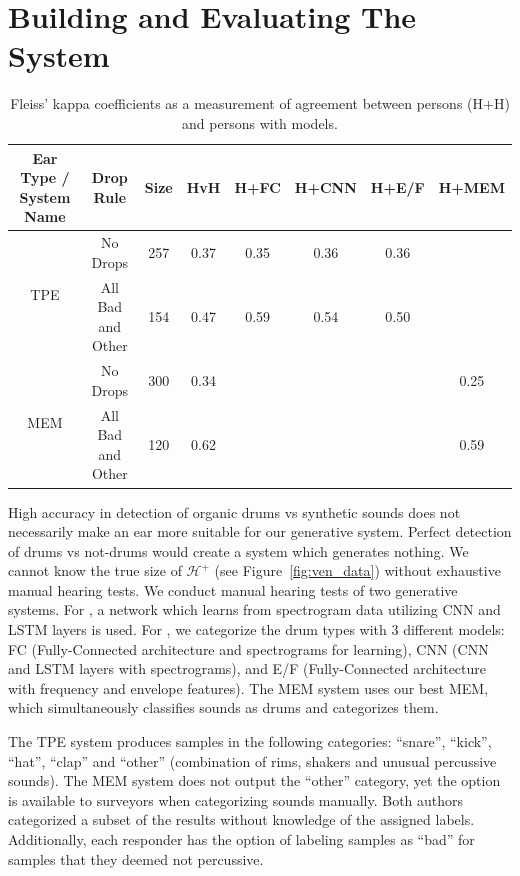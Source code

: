 \documentclass[runningheads,a4paper]{llncs}
\begin{document}
\section{Building and Evaluating The System}
\begin{table}[]
\centering
\begin{tabular}{|c|c|c|c|c|c|c|c|}
\hline
Ear Type / System Name & Drop Rule         & Size & HvH  & H+FC & H+CNN & H+E/F & H+MEM \\ \hline
\multirow{2}{*}{TPE} & No Drops          & 257  & 0.37 & 0.35 & 0.36  & 0.36  &       \\ \cline{2-8} 
                     & All Bad and Other   & 154  & 0.47 & 0.59 & 0.54  & 0.50  &       \\ \hline
\multirow{2}{*}{MEM} & No Drops          & 300  & 0.34 &      &       &       & 0.25  \\ \cline{2-8} 
                     & All Bad and Other & 120  & 0.62 &      &       &       & 0.59  \\ \hline
\end{tabular}

\caption{Fleiss’ kappa coefficients as a measurement of agreement between persons (H+H) and persons with models.  }
\end{table}
High accuracy in detection of organic drums vs synthetic sounds does not necessarily make an ear more suitable for our generative system. Perfect detection of drums vs not-drums would create a system which generates nothing.  We cannot know the true size of $\mathcal{H^{+}}$ (see Figure~\ref{fig:ven_data}) without exhaustive manual hearing tests. We conduct manual hearing tests of two generative systems. For \decfirst, a network which learns from spectrogram data utilizing CNN and LSTM layers is used. For \decsecond, we categorize the drum types with 3 different models: FC (Fully-Connected architecture and spectrograms for learning), CNN (CNN and LSTM layers with spectrograms), and E/F (Fully-Connected architecture with frequency and envelope features). The MEM system uses our best MEM, which simultaneously classifies sounds as drums and categorizes them. 

The TPE system produces samples in the following categories: \enquote{snare}, \enquote{kick}, \enquote{hat}, \enquote{clap} and \enquote{other} (combination of rims, shakers and unusual percussive sounds). The MEM system does not output the \enquote{other} category, yet the option is available to surveyors when categorizing sounds manually.   
Both authors categorized a subset of the results without knowledge of the assigned labels. Additionally, each responder has the option of labeling samples as \enquote{bad} for samples that they deemed not percussive. 
\end{document}
